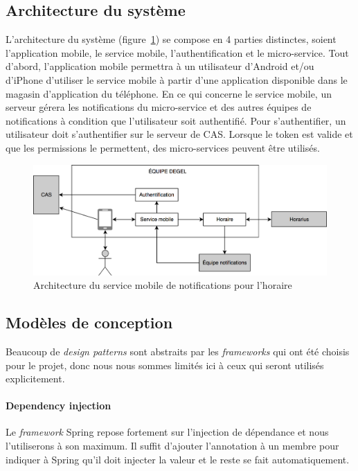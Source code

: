 	\subsection{Architecture du système}
	L’architecture du système (figure~\ref{fig.architecture}) se compose en 4 parties distinctes, soient l’application mobile, le service mobile, l’authentification et le micro-service. Tout d’abord, l’application mobile permettra à un utilisateur d’Android et/ou d’iPhone d’utiliser le service mobile à partir d’une application disponible dans le magasin d’application du téléphone. En ce qui concerne le service mobile, un serveur gérera les notifications du micro-service et des autres équipes de notifications à condition que l’utilisateur soit authentifié. Pour s'authentifier, un utilisateur doit s’authentifier sur le serveur de CAS. Lorsque le token est valide et que les permissions le permettent, des micro-services peuvent être utilisés.

	\begin{figure}[hp]
		\centering
		\includegraphics[width=\textwidth]{Figures/Architecture}
		\caption{Architecture du service mobile de notifications pour l’horaire}
		\label{fig.architecture}
	\end{figure}


	\subsection{Modèles de conception}
	Beaucoup de \emph{design patterns} sont abstraits par les \emph{frameworks} qui ont été choisis pour le projet, donc nous nous sommes limités ici à ceux qui seront utilisés explicitement.
	\paragraph{Dependency injection} Le \emph{framework} Spring repose fortement sur l’injection de dépendance et nous l’utiliserons à son maximum. Il suffit d’ajouter l’annotation  à un membre pour indiquer à Spring qu’il doit injecter la valeur et le reste se fait automatiquement.
